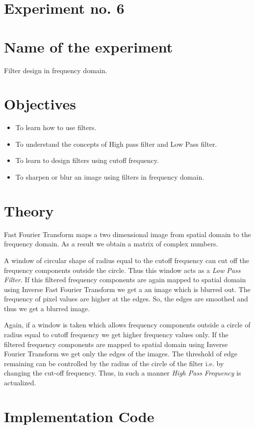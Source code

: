 \documentclass[a4paper,11pt]{article}
\begin{document}
	\section*{Experiment no. 6}
	\section*{Name of the experiment}
	Filter design in frequency domain.
	\section*{Objectives}
	\begin{itemize}
		\item To learn how to use filters. 
		\item To understand the concepts of High pass filter and Low Pass filter.
		\item To learn to design filters using cutoff frequency.
		\item To sharpen or blur an image using filters in frequency domain.
		
	\end{itemize}
	\section*{Theory}
	Fast Fourier Transform maps a two dimensional image from spatial domain to the frequency domain. As a result we obtain a matrix of complex numbers. 
	
	A window of circular shape of radius equal to the cutoff frequency can cut off the frequency components outside the circle. Thus this window acts as a \emph{Low Pass Filter}. If this filtered frequency components are again mapped to spatial domain using Inverse Fast Fourier Transform we get a an image which is blurred out. The frequency of pixel values are higher at the edges. So, the edges are smoothed and thus we get a blurred image.
	
	Again, if a window is taken which allows frequency components outside a circle of radius equal to cutoff frequency we get higher frequency values only. If the filtered frequency components are mapped to spatial domain using Inverse Fourier Transform we get only the edges of the images. The threshold of edge remaining can be controlled by the radius of the circle of the filter i.e. by changing the cut-off frequency. Thus, in such a manner \emph{High Pass Frequency} is actualized.
	
	
	\section*{Implementation Code}  
	\captionsetup{labelformat=empty,labelsep=none}
	
	
	
\end{document}
